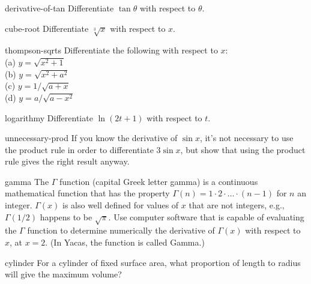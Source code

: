 \begin{hwsection}
\begin{hwwithsoln}{derivative-of-tan}
Differentiate $\tan\theta$ with respect to $\theta$.
\end{hwwithsoln}

\begin{hwwithsoln}{cube-root}
Differentiate $\sqrt[3]{x}$ with respect to $x$.
\end{hwwithsoln}

\begin{hwwithsoln}{thompson-sqrts}
Differentiate the following with respect to $x$:\\
(a) $y=\sqrt{x^2+1}$ \\
(b) $y=\sqrt{x^2+a^2}$ \\
(c) $y=1/\sqrt{a+x}$ \\
(d) $y=a/\sqrt{a-x^2}$ \\
 \thompson
\end{hwwithsoln}

\begin{hwwithsoln}{logarithmy}
Differentiate $\ln(2t+1)$ with respect to $t$.
\end{hwwithsoln}

\begin{hwwithsoln}{unnecessary-prod}
If you know the derivative of $\sin x$, it's not necessary to use the product rule in order
to differentiate $3\sin x$, but show that using the product rule gives the right result anyway.
\end{hwwithsoln}

\begin{hwwithsoln}{gamma}
The $\Gamma$ function (capital Greek letter gamma) is a continuous mathematical function that
has the property $\Gamma(n)=1\cdot2\cdot\ldots\cdot(n-1)$ for $n$ an integer. $\Gamma(x)$ is also well
defined for values of $x$ that are not integers, e.g., $\Gamma(1/2)$ happens to be $\sqrt{\pi}$.
Use computer software that is capable of evaluating the $\Gamma$ function to determine numerically
the derivative of $\Gamma(x)$ with respect to $x$, at $x=2$. (In Yacas, the function is called Gamma.)
\end{hwwithsoln}

\begin{hwwithsoln}{cylinder}
For a cylinder of fixed surface area, what proportion of length to radius will give the maximum volume?
\end{hwwithsoln}


\end{hwsection}
